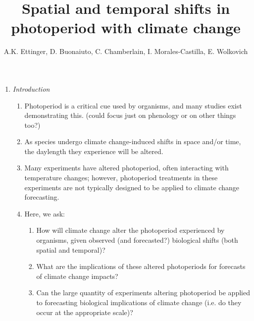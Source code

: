 \documentclass{article}
\begin{document}
 
\title{Spatial and temporal shifts in photoperiod with climate change} %

\author{A.K. Ettinger, D. Buonaiuto, C. Chamberlain, I. Morales-Castilla, E. Wolkovich}
\maketitle  %
\begin{enumerate}
\item \textit{Introduction}
\begin{enumerate}
\item Photoperiod is a critical cue used by organisms, and many studies exist demonstrating this. (could focus just on phenology or on other things too?)
\item As species undergo climate change-induced shifts in space and/or time, the daylength they experience will be altered. 
\item Many experiments have altered photoperiod, often interacting with temperature changes; however, photoperiod treatments in these experiments are not typically designed to be applied to climate change forecasting. 
\item Here, we ask: 
\begin{enumerate}
\item How will climate change alter the photoperiod experienced by organisms, given observed (and forecasted?) biological shifts (both spatial and temporal)?
\item What are the implications of these altered photoperiods for forecasts of climate change impacts?
\item Can the large quantity of experiments altering photoperiod be applied to forecasting biological implications of climate change (i.e. do they occur at the appropriate scale)?
\end{enumerate}
\end{enumerate}


\end{enumerate}
\end{document}
